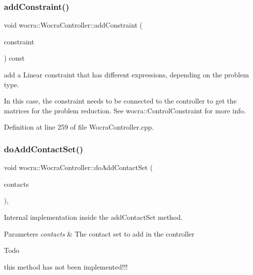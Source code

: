 \subsubsection{\texorpdfstring{add\+Constraint()}{addConstraint()}\hspace{0.1cm}{\footnotesize\ttfamily [2/2]}}
{\footnotesize\ttfamily void wocra\+::\+Wocra\+Controller\+::add\+Constraint (\begin{DoxyParamCaption}\item[{\hyperlink{classocra_1_1ControlConstraint}{ocra\+::\+Control\+Constraint} \&}]{constraint }\end{DoxyParamCaption}) const}

add a Linear constraint that has different expressions, depending on the problem type.

In this case, the constraint needs to be connected to the controller to get the matrices for the problem reduction. See wocra\+::\+Control\+Constraint for more info. 

Definition at line 259 of file Wocra\+Controller.\+cpp.

\hypertarget{classwocra_1_1WocraController_a74d8fa3103ca3787add351620c5bcf73}{}\label{classwocra_1_1WocraController_a74d8fa3103ca3787add351620c5bcf73} 
\subsubsection{\texorpdfstring{do\+Add\+Contact\+Set()}{doAddContactSet()}}
{\footnotesize\ttfamily void wocra\+::\+Wocra\+Controller\+::do\+Add\+Contact\+Set (\begin{DoxyParamCaption}\item[{const \hyperlink{classocra_1_1ContactSet}{Contact\+Set} \&}]{contacts }\end{DoxyParamCaption})\hspace{0.3cm}{\ttfamily [protected]}, {\ttfamily [virtual]}}

Internal implementation inside the add\+Contact\+Set method.


\begin{DoxyParams}{Parameters}
{\em contacts} & The contact set to add in the controller\\
\hline
\end{DoxyParams}
\begin{DoxyRefDesc}{Todo}
\item[\hyperlink{todo__todo000003}{Todo}]this method has not been implemented!!!\end{DoxyRefDesc}



